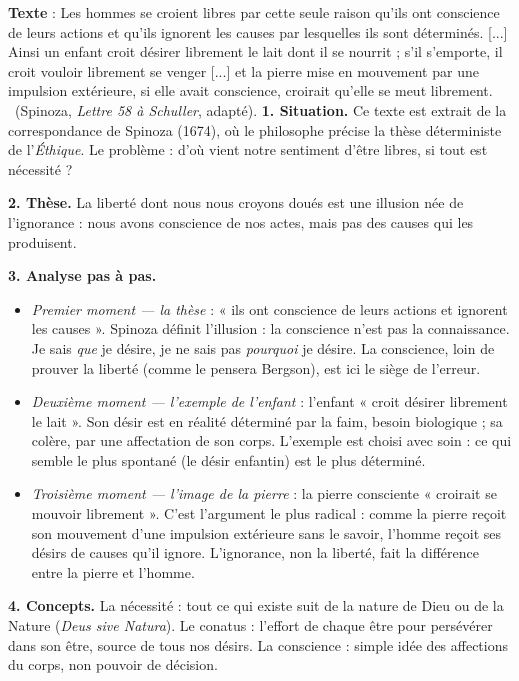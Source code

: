 \documentclass[11pt]{article}
\newcommand{\cle}[1]{{\popxbold\color{popdark}#1}}
\begin{document}
\begin{experience}
\textbf{Texte} : \guillemotleft Les hommes se croient libres par cette seule raison qu'ils ont conscience de leurs actions et qu'ils ignorent les causes par lesquelles ils sont déterminés. [...] Ainsi un enfant croit désirer librement le lait dont il se nourrit ; s'il s'emporte, il croit vouloir librement se venger [...] et la pierre mise en mouvement par une impulsion extérieure, si elle avait conscience, croirait qu'elle se meut librement. \guillemotright\ (Spinoza, \emph{Lettre 58 à Schuller}, adapté).
\tcblower
\textbf{1. Situation.} Ce texte est extrait de la correspondance de Spinoza (1674), où le philosophe précise la thèse déterministe de l'\emph{Éthique}. Le problème : d'où vient notre sentiment d'être libres, si tout est nécessité ?

\textbf{2. Thèse.} La liberté dont nous nous croyons doués est une illusion née de l'ignorance : nous avons conscience de nos actes, mais pas des causes qui les produisent.

\textbf{3. Analyse pas à pas.}
\begin{itemize}
\item \emph{Premier moment — la thèse} : « ils ont conscience de leurs actions et ignorent les causes ». Spinoza définit l'illusion : la conscience n'est pas la connaissance. Je sais \emph{que} je désire, je ne sais pas \emph{pourquoi} je désire. La conscience, loin de prouver la liberté (comme le pensera Bergson), est ici le siège de l'erreur.
\item \emph{Deuxième moment — l'exemple de l'enfant} : l'enfant « croit désirer librement le lait ». Son désir est en réalité déterminé par la faim, besoin biologique ; sa colère, par une affectation de son corps. L'exemple est choisi avec soin : ce qui semble le plus spontané (le désir enfantin) est le plus déterminé.
\item \emph{Troisième moment — l'image de la pierre} : la pierre consciente « croirait se mouvoir librement ». C'est l'argument le plus radical : comme la pierre reçoit son mouvement d'une impulsion extérieure sans le savoir, l'homme reçoit ses désirs de causes qu'il ignore. L'ignorance, non la liberté, fait la différence entre la pierre et l'homme.
\end{itemize}

\textbf{4. Concepts.} La \cle{nécessité} : tout ce qui existe suit de la nature de Dieu ou de la Nature (\emph{Deus sive Natura}). Le \cle{conatus} : l'effort de chaque être pour persévérer dans son être, source de tous nos désirs. La \cle{conscience} : simple idée des affections du corps, non pouvoir de décision.


\end{experience}
\end{document}
